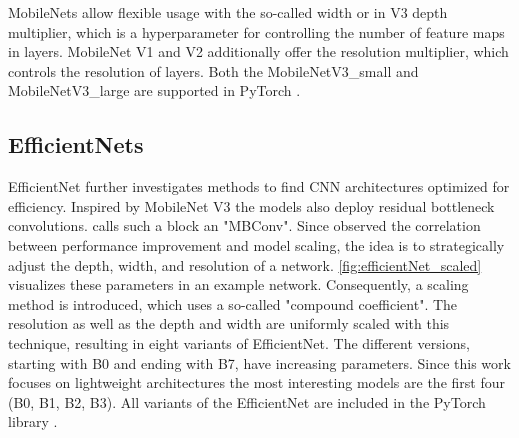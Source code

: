 MobileNets allow flexible usage with the so-called width or in V3 depth multiplier, which is a hyperparameter for controlling the number of feature maps in layers.
MobileNet V1 and V2 additionally offer the resolution multiplier, which controls the resolution of layers.
Both the MobileNetV3\_small and MobileNetV3\_large are supported in PyTorch \cite{pytorchmobilenetv3}.

\subsection{EfficientNets}

EfficientNet \cite{EfficientNet} further investigates methods to find \ac{CNN} architectures optimized for efficiency.
Inspired by MobileNet V3 the models also deploy residual bottleneck convolutions.
\cite{EfficientNet} calls such a block an "MBConv".
Since \cite{EfficientNet} observed the correlation between performance improvement and model scaling, the idea is to strategically adjust the depth, width, and resolution of a network.
\autoref{fig:efficientNet_scaled} visualizes these parameters in an example network.
Consequently, a scaling method is introduced, which uses a so-called "compound coefficient".
The resolution as well as the depth and width are uniformly scaled with this technique, resulting in eight variants of EfficientNet.
The different versions, starting with B0 and ending with B7, have increasing parameters.
Since this work focuses on lightweight architectures the most interesting models are the first four (B0, B1, B2, B3).
All variants of the EfficientNet are included in the PyTorch library \cite{pytorchefficientNets}.


